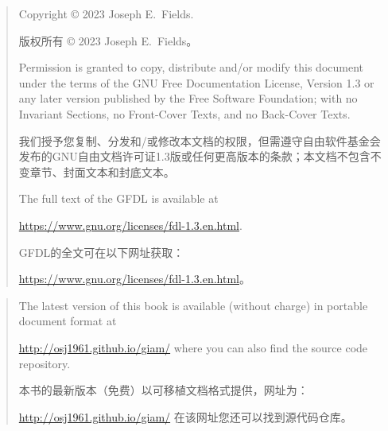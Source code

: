 \rule{0pt}{0pt}

\vfill

\begin{quote}
    Copyright \copyright{}  2023  Joseph E.\ Fields.

    版权所有 \copyright{}  2023  Joseph E.\ Fields。

    Permission is granted to copy, distribute and/or modify this document
    under the terms of the GNU Free Documentation License, Version 1.3
    or any later version published by the Free Software Foundation;
    with no Invariant Sections, no Front-Cover Texts, and no Back-Cover Texts.

    我们授予您复制、分发和/或修改本文档的权限，但需遵守自由软件基金会发布的GNU自由文档许可证1.3版或任何更高版本的条款；本文档不包含不变章节、封面文本和封底文本。

    The full text of the GFDL is available at\newline
	\rule{0pt}{0pt} \hspace{.5in} \url{https://www.gnu.org/licenses/fdl-1.3.en.html}.

    GFDL的全文可在以下网址获取：\newline
	\rule{0pt}{0pt} \hspace{.5in} \url{https://www.gnu.org/licenses/fdl-1.3.en.html}。
\end{quote}

\vfill

\begin{quote}
The latest version of this book is available (without charge) in portable document format at\newline 
\rule{0.0pt}{0.0pt} \hspace{.5in} \url{http://osj1961.github.io/giam/} \newline
where you can also find the source code repository.

本书的最新版本（免费）以可移植文档格式提供，网址为：\newline 
\rule{0.0pt}{0.0pt} \hspace{.5in} \url{http://osj1961.github.io/giam/} \newline
在该网址您还可以找到源代码仓库。
\end{quote}

\vfill